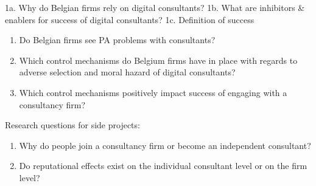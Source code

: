 \documentclass[12pt]{article}
\providecommand{\tightlist}{%
  \setlength{\itemsep}{0pt}\setlength{\parskip}{0pt}}
\begin{document}
1a. Why do Belgian firms rely on digital consultants? 1b. What are
inhibitors \& enablers for success of digital consultants? 1c.
Definition of success

\begin{enumerate}
\def\labelenumi{\arabic{enumi}.}
\setcounter{enumi}{1}
\tightlist
\item
  Do Belgian firms see PA problems with consultants?
\item
  Which control mechanisms do Belgium firms have in place with regards
  to adverse selection and moral hazard of digital consultants?
\item
  Which control mechanisms positively impact success of engaging with a
  consultancy firm?
\end{enumerate}

Research questions for side projects:

\begin{enumerate}
\def\labelenumi{\arabic{enumi}.}
\tightlist
\item
  Why do people join a consultancy firm or become an independent
  consultant?
\item
  Do reputational effects exist on the individual consultant level or on
  the firm level?
\end{enumerate}



\end{document}

